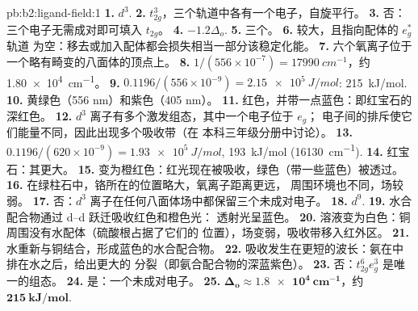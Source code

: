 \begin{solution}{pb:b2:ligand-field:1}
\textbf{1.} $d^3$.
\textbf{2.} $t_{2g}^3$，三个轨道中各有一个电子，自旋平行。
\textbf{3.} 否：三个电子无需成对即可填入 $t_{2g}$。
\textbf{4.} $-1.2\Delta_o$.
\textbf{5.} 三个。
\textbf{6.} 较大，且指向配体的 $e_g^*$ 轨道
为空：移去或加入配体都会损失相当一部分该稳定化能。
\textbf{7.} 六个氧离子位于一个略有畸变的八面体的顶点上。
\textbf{8.} $1/(556 \times 10^{-7}) = \qty{17990}{cm^{-1}}$，约 \qty{1.80e4}{cm^{-1}}。
\textbf{9.} $0.1196/(556 \times 10^{-9}) = \qty{2.15e5}{J/mol}$: \qty{215}{kJ/mol}.
\textbf{10.} 黄绿色（556 nm）和紫色（405 nm）。
\textbf{11.} 红色，并带一点蓝色：即红宝石的深红色。
\textbf{12.} $d^3$ 离子有多个激发组态，其中一个电子位于 $e_g$；
电子间的排斥使它们能量不同，因此出现多个吸收带（在
本科三年级分册中讨论）。
\textbf{13.} $0.1196/(620 \times 10^{-9}) = \qty{1.93e5}{J/mol}$, \qty{193}{kJ/mol}
(\qty{16130}{cm^{-1}}).
\textbf{14.} 红宝石：其更大。
\textbf{15.} 变为橙红色：红光现在被吸收，绿色（带一些蓝色）被透过。
\textbf{16.} 在绿柱石中，铬所在的位置略大，氧离子距离更远，
周围环境也不同，场较弱。
\textbf{17.} 否：$d^3$ 离子在任何八面体场中都保留三个未成对电子。
\textbf{18.} $d^9$.
\textbf{19.} 水合配合物通过 d–d 跃迁吸收红色和橙色光：
透射光呈蓝色。
\textbf{20.} 溶液变为白色：铜周围没有水配体（硫酸根占据了它们的
位置），场变弱，吸收带移入红外区。
\textbf{21.} 水重新与铜结合，形成蓝色的水合配合物。
\textbf{22.} 吸收发生在更短的波长：氨在中排在水之后，给出更大的
分裂（即氨合配合物的深蓝紫色）。
\textbf{23.} 否：$t_{2g}^6e_g^3$ 是唯一的组态。
\textbf{24.} 是：一个未成对电子。
\textbf{25.} $\boldsymbol{\Delta_o \approx \qty{1.8e4}{cm^{-1}}}$，约
$\boldsymbol{\qty{215}{kJ/mol}}$.
\end{solution}

